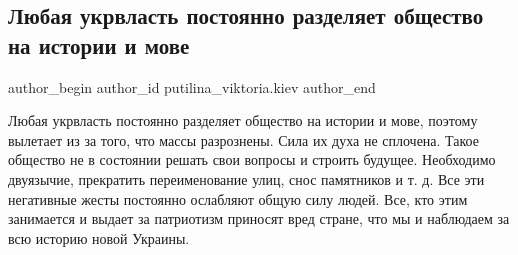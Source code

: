  
 
 
 
 
 
\subsection{Любая укрвласть постоянно разделяет общество на истории и мове}
\label{sec:24_11_2021.fb.putilina_viktoria.kiev.1.ukrvlast}
 
\ifcmt
 author_begin
   author_id putilina_viktoria.kiev
 author_end
\fi

Любая укрвласть постоянно разделяет общество на истории и мове, поэтому
вылетает из за того, что массы разрознены. Сила их духа не сплочена. Такое
общество не в состоянии решать свои вопросы и строить будущее. Необходимо
двуязычие, прекратить переименование улиц, снос памятников и т. д. Все эти
негативные жесты постоянно ослабляют общую силу людей. Все, кто этим занимается
и выдает за патриотизм приносят вред стране, что мы и наблюдаем за всю историю
новой Украины.

